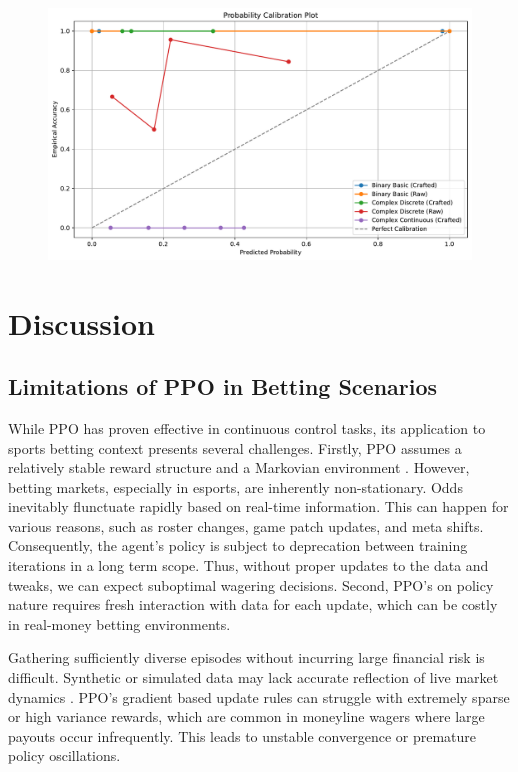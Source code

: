 \documentclass[sigconf]{acmart}
\begin{document}
\begin{figure}[t]
  \centering
  \includegraphics[width=\textwidth]{probability_distribution_all.pdf}
  \caption{}
  \label{fig:probability_distribution_all}
\end{figure}


\section{Discussion}

\subsection{Limitations of PPO in Betting Scenarios}

While PPO has proven effective in continuous control tasks, its application to sports betting context presents several challenges. Firstly, PPO assumes a relatively stable reward structure and a Markovian environment \cite{schulman2017proximalpolicyoptimizationalgorithms}. However, betting markets, especially in esports, are inherently non-stationary. Odds inevitably flunctuate rapidly based on real-time information. This can happen for various reasons, such as roster changes, game patch updates, and meta shifts. Consequently, the agent's policy is subject to deprecation between training iterations in a long term scope. Thus, without proper updates to the data and tweaks, we can expect suboptimal wagering decisions. Second, PPO's on policy nature requires fresh interaction with data for each update, which can be costly in real-money betting environments.

Gathering sufficiently diverse episodes without incurring large financial risk is difficult. Synthetic or simulated data may lack accurate reflection of live market dynamics \cite{jansen2020rlbetting}. PPO's gradient based update rules can struggle with extremely sparse or high variance rewards, which are common in moneyline wagers where large payouts occur infrequently. This leads to unstable convergence or premature policy oscillations. 
\end{document}
